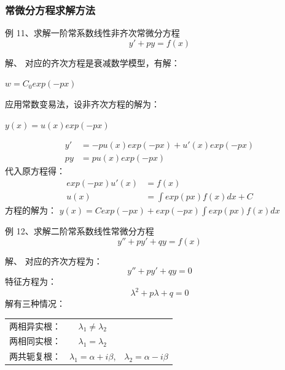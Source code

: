 \begin{frame}
\frametitle{常微分方程求解方法}
	\begin{exampleblock} {例 11、求解一阶常系数线性非齐次常微分方程}
	\begin{equation*}
		y'+py=f(x)
	\end{equation*}
	\end{exampleblock}
	\alert{解、} 对应的齐次方程是衰减数学模型，有解：\\
	\begin{center}
		$w=C_0 exp(-px)$
	\end{center} 
	应用常数变易法，设非齐次方程的解为：\\
	\begin{center}
		$y(x) =u(x) exp(-px)$
	\end{center} 
\end{frame}

\begin{frame}
	\begin{align*}
		y'&= -p u(x) exp(-px) + u'(x) exp(-px)   \\
		py&= p u(x) exp(-px)
	\end{align*}	
	代入原方程得：
	\begin{align*}
		exp(-px)u'(x)&= f(x)\\
		u(x) &= \int exp(px) f (x)dx + C
	\end{align*}
	方程的解为： $ y(x)=C exp(-px)+exp(-px) \int exp(px)f(x)dx $ \\
\end{frame}

\begin{frame}
\begin{exampleblock} {例 12、求解二阶常系数线性常微分方程}
	\begin{equation*}
		y''+py'+qy=f(x)
	\end{equation*}
	\end{exampleblock}
	\alert{解、} 对应的齐次方程为：
	\begin{equation*}
		y''+py'+qy=0
	\end{equation*}
	特征方程为：
	\begin{equation*}
		\lambda^2 +p\lambda +q=0
	\end{equation*}
	解有三种情况：
	\begin{table} [H]
	\begin{tabular}{ccc}
		两相异实根：& $\lambda_1 \ne \lambda_2 $ & \\
		两相同实根：& $\lambda_1 = \lambda_2 $  &\\
		两共轭复根：& $\lambda_1=\alpha+i\beta $, & $\lambda_2=\alpha-i\beta$\\ 
	\end{tabular}
	\end{table}
\end{frame}

